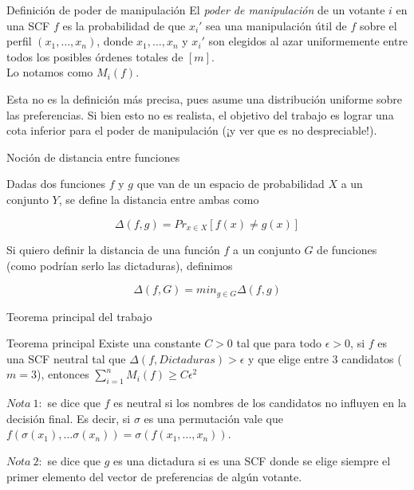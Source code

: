 \documentclass[compress]{beamer}
\begin{document}
\begin{frame}

\begin{block}{Definición de poder de manipulación}
El \textit{poder de manipulación} de un votante $i$ en una SCF $f$ 
es la probabilidad de que $x_i'$ sea una manipulación útil de $f$
sobre el perfil $(x_1, \ldots, x_n)$, donde $x_1, \ldots, x_n$ y $x_i'$
son elegidos al azar uniformemente entre todos los posibles órdenes
totales de $[m]$.\\
Lo notamos como $M_i(f)$.
\end{block}
\bigskip

Esta no es la definición más precisa, pues asume una distribución uniforme
sobre las preferencias. Si bien esto no es realista, el objetivo del
trabajo es lograr una cota inferior para el poder de manipulación (¡y ver
que es no despreciable!).
\end{frame}

\begin{frame}{Noción de distancia entre funciones}

Dadas dos funciones $f$ y $g$ que van de un espacio de probabilidad $X$
a un conjunto $Y$, se define la distancia entre ambas como

$$ \Delta(f, g) = Pr_{x \in X} [f(x) \neq g(x)] $$

Si quiero definir la distancia de una función $f$ a un conjunto $G$ de
funciones (como podrían serlo las dictaduras), definimos

$$ \Delta(f, G) = min_{g \in G} \Delta(f, g) $$

\end{frame}

\begin{frame}{Teorema principal del trabajo}

\begin{block}{Teorema principal}
Existe una constante $C > 0$ tal que para todo $\epsilon > 0$, si $f$ es
una SCF neutral tal que $\Delta(f, Dictaduras) > \epsilon$ y que 
elige entre 3 candidatos ($m = 3$), 
entonces $\sum_{i=1}^n M_i(f) \geq C \epsilon^2$
\end{block}
\bigskip

$Nota \ 1:$ se dice que $f$ es neutral si los nombres de los candidatos no
influyen en la decisión final. Es decir, si $\sigma$ es una permutación
vale que $f(\sigma(x_1), \ldots \sigma(x_n)) = \sigma(f(x_1,\ldots,x_n))$.\\
\bigskip

$Nota \ 2:$ se dice que $g$ es una dictadura si es una SCF donde 
se elige siempre el primer elemento del vector de preferencias de 
algún votante.

\end{frame}
\end{document}
